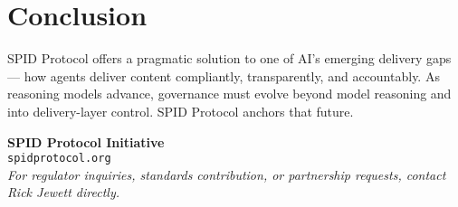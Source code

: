 \documentclass[conference]{IEEEtran}
\begin{document}
\section{Conclusion}

SPID Protocol offers a pragmatic solution to one of AI's emerging delivery gaps — how agents deliver content compliantly, transparently, and accountably. As reasoning models advance, governance must evolve beyond model reasoning and into delivery-layer control. SPID Protocol anchors that future.

\vspace{0.5in}

\begin{center}
\textbf{SPID Protocol Initiative} \\
\texttt{spidprotocol.org} \\
\textit{For regulator inquiries, standards contribution, or partnership requests, contact Rick Jewett directly.}
\end{center}
\end{document}
